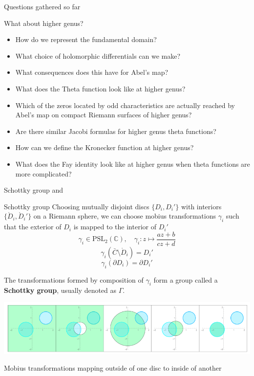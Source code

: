 \documentclass[11pt,aspectratio=169]{beamer}
\begin{document}
\begin{frame}{Questions gathered so far}
    {
        \vspace*{\fill}
        \begin{block}{What about higher genus?}
            \begin{itemize}
                \item How do we represent the fundamental domain?
                \item What choice of holomorphic differentials can we make?
                \item What consequences does this have for Abel's map?
                \item What does the Theta function look like at higher genus?
                \item Which of the zeros located by odd characteristics are actually reached by Abel's map on compact Riemann surfaces of higher genus?
                \item Are there similar Jacobi formulas for higher genus theta functions?
                \item How can we define the Kronecker function at higher genus?
                \item What does the Fay identity look like at higher genus when theta functions are more complicated?
            \end{itemize}
        \end{block}
        \vspace*{\fill}
    }
\end{frame}

\begin{frame}{Schottky group}{\tiny \cite{ComputationalSchottky} and \cite{Cha22}}
    \begin{block}{Schottky group}
        Choosing mutually disjoint discs $\{D_i,D_i'\}$ with interiors $\{\mathring{D}_i,\mathring{D}_i'\}$ on a Riemann sphere,
        we can choose mobius transformations $\gamma_i$ such that the exterior of $D_i$ is mapped to the interior of $D_i'$
        \[\gamma_i \in \text{PSL}_2(\mathbb C) , \quad \gamma_i : z \mapsto \frac{az+b}{cz+d}\]
        \[\gamma_i(\bar C \setminus \mathring{D}_i) = D_i'\]
        \[\gamma_i(\partial D_i) = \partial D_i'\]

        The transformations formed by composition of $\gamma_i$ form a group called a \textbf{Schottky group}, usually denoted as $\Gamma$.
    \end{block}

    \center{}
    \includegraphics[width=0.7\columnwidth]{assets/ChanSchottkyGroup.png}

    \tiny Mobius transformations mapping outside of one disc to inside of another

    \cite{Cha22}
\end{frame}
\end{document}
